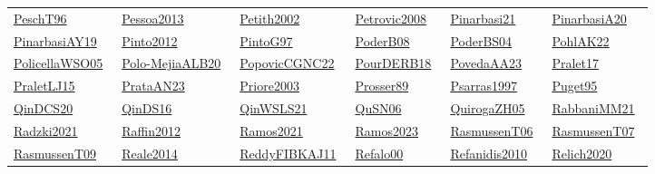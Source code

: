 \begin{longtable}{*{6}{l}}
\href{../}{PeschT96}~\cite{PeschT96} & \href{../works/Pessoa2013.pdf}{Pessoa2013}~\cite{Pessoa2013} & \href{../works/Petith2002.pdf}{Petith2002}~\cite{Petith2002} & \href{../}{Petrovic2008}~\cite{Petrovic2008} & \href{../}{Pinarbasi21}~\cite{Pinarbasi21} & \href{../}{PinarbasiA20}~\cite{PinarbasiA20}\\ 
\href{../works/PinarbasiAY19.pdf}{PinarbasiAY19}~\cite{PinarbasiAY19} & \href{../works/Pinto2012.pdf}{Pinto2012}~\cite{Pinto2012} & \href{../works/PintoG97.pdf}{PintoG97}~\cite{PintoG97} & \href{../works/PoderB08.pdf}{PoderB08}~\cite{PoderB08} & \href{../works/PoderBS04.pdf}{PoderBS04}~\cite{PoderBS04} & \href{../works/PohlAK22.pdf}{PohlAK22}~\cite{PohlAK22}\\ 
\href{../works/PolicellaWSO05.pdf}{PolicellaWSO05}~\cite{PolicellaWSO05} & \href{../works/Polo-MejiaALB20.pdf}{Polo-MejiaALB20}~\cite{Polo-MejiaALB20} & \href{../works/PopovicCGNC22.pdf}{PopovicCGNC22}~\cite{PopovicCGNC22} & \href{../works/PourDERB18.pdf}{PourDERB18}~\cite{PourDERB18} & \href{../works/PovedaAA23.pdf}{PovedaAA23}~\cite{PovedaAA23} & \href{../works/Pralet17.pdf}{Pralet17}~\cite{Pralet17}\\ 
\href{../works/PraletLJ15.pdf}{PraletLJ15}~\cite{PraletLJ15} & \href{../works/PrataAN23.pdf}{PrataAN23}~\cite{PrataAN23} & \href{../works/Priore2003.pdf}{Priore2003}~\cite{Priore2003} & \href{../works/Prosser89.pdf}{Prosser89}~\cite{Prosser89} & \href{../works/Psarras1997.pdf}{Psarras1997}~\cite{Psarras1997} & \href{../works/Puget95.pdf}{Puget95}~\cite{Puget95}\\ 
\href{../works/QinDCS20.pdf}{QinDCS20}~\cite{QinDCS20} & \href{../works/QinDS16.pdf}{QinDS16}~\cite{QinDS16} & \href{../works/QinWSLS21.pdf}{QinWSLS21}~\cite{QinWSLS21} & \href{../works/QuSN06.pdf}{QuSN06}~\cite{QuSN06} & \href{../works/QuirogaZH05.pdf}{QuirogaZH05}~\cite{QuirogaZH05} & \href{../}{RabbaniMM21}~\cite{RabbaniMM21}\\ 
\href{../works/Radzki2021.pdf}{Radzki2021}~\cite{Radzki2021} & \href{../}{Raffin2012}~\cite{Raffin2012} & \href{../works/Ramos2021.pdf}{Ramos2021}~\cite{Ramos2021} & \href{../works/Ramos2023.pdf}{Ramos2023}~\cite{Ramos2023} & \href{../works/RasmussenT06.pdf}{RasmussenT06}~\cite{RasmussenT06} & \href{../works/RasmussenT07.pdf}{RasmussenT07}~\cite{RasmussenT07}\\ 
\href{../works/RasmussenT09.pdf}{RasmussenT09}~\cite{RasmussenT09} & \href{../works/Reale2014.pdf}{Reale2014}~\cite{Reale2014} & \href{../works/ReddyFIBKAJ11.pdf}{ReddyFIBKAJ11}~\cite{ReddyFIBKAJ11} & \href{../works/Refalo00.pdf}{Refalo00}~\cite{Refalo00} & \href{../works/Refanidis2010.pdf}{Refanidis2010}~\cite{Refanidis2010} & \href{../works/Relich2020.pdf}{Relich2020}~\cite{Relich2020}\\ 

\end{longtable}
